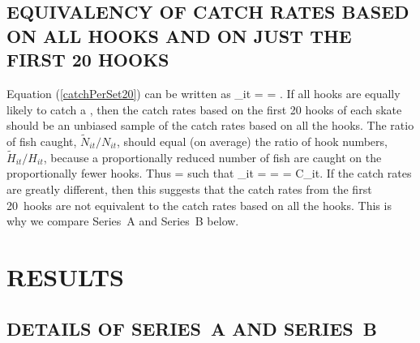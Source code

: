\subsection{EQUIVALENCY OF CATCH RATES BASED ON ALL HOOKS AND ON JUST THE FIRST 20 HOOKS}

Equation (\ref{catchPerSet20}) can be written as 
\eb
{}_{it} =  =   .
\label{tildeCatchPerSet}
\ee
If all hooks are equally likely to catch a \spName, then the catch rates based
on the first 20 hooks of each skate should be an unbiased sample of the catch
rates based on all the hooks.
%
%
The ratio of fish caught, $\tilde{N}_{it} / N_{it}$, should equal (on average)
the ratio of hook numbers, $\tilde{H}_{it} / H_{it}$, because a proportionally
reduced number of fish are caught on the proportionally fewer hooks. Thus
\eb
{} = 
\ee
such that
\eb
{}_{it} =   =  = C_{it}.
\ee
If the catch rates are greatly different, then this suggests that the catch
rates from the first 20~hooks are not equivalent to the catch rates based on all
the hooks. This is why we compare Series~A and Series~B below.

\section{RESULTS}\label{sec:combine}

\subsection{DETAILS OF SERIES~A AND SERIES~B}


